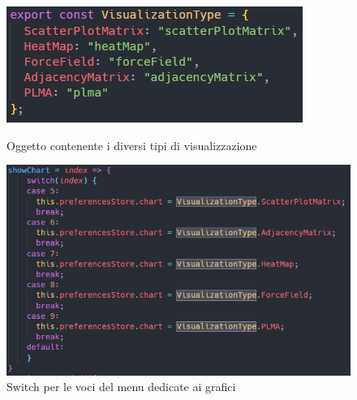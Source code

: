 \begin{figure}[!htb]
	\includegraphics[width=\linewidth]{Images/vistype}
	\caption{Oggetto contenente i diversi tipi di visualizzazione}
	\label{vistype}
\endminipage\hfill
{}
	\includegraphics[width=\linewidth]{Images/menu}
	\caption{Switch per le voci del menu dedicate ai grafici}
	\label{switchmenu}
\endminipage
\end{figure}

